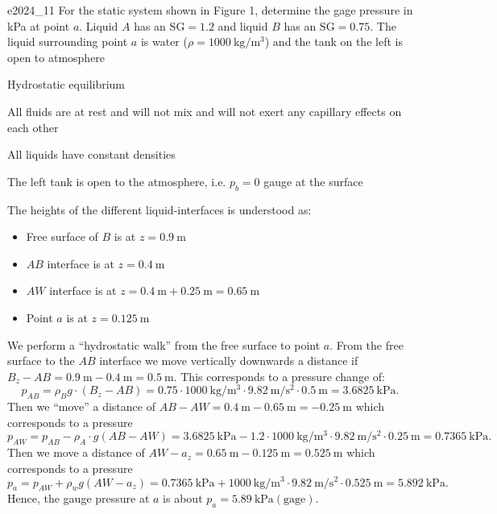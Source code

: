 

\begin{problemwithimage}{e2024_1}{1}
  For the static system shown in Figure 1, determine the gage pressure in \unit{\kPa} at point $a$.
  Liquid $A$ has an $\mathrm{SG} = \num{1,2} $ and liquid $B$ has an $\mathrm{SG} = \num{0,75}$.
  The liquid surrounding point $a$ is water ($\rho = \qty{1000}{\kg\per\m^3} $) and the tank on the left is open to atmosphere
\end{problemwithimage}

\begin{assumptions}
  \item Hydrostatic equilibrium
  \item All fluids are at rest and will not mix and will not exert any capillary effects on each other
  \item All liquids have constant densities 
  \item The left tank is open to the atmosphere, i.e. $p_b = 0$ gauge at the surface
\end{assumptions}

\begin{derivation}
  The heights of the different liquid-interfaces is understood as:
  \begin{itemize}
    \item Free surface of $B$ is at $z = \qty{0,9}{\m}$
    \item $AB$ interface is at $z = \qty{0,4}{\m}$
    \item $AW$ interface is at $z = \qty{0,4}{\m} + \qty{0,25}{\m} = \qty{0,65}{\m}$
    \item Point $a$ is at $z = \qty{0,125}{\m}$
  \end{itemize}
  We perform a ``hydrostatic walk'' from the free surface to point $a$.
  From the free surface to the $AB$ interface we move vertically downwards a distance if $B_z - AB = \qty{0,9}{\m} - \qty{0,4}{\m} = \qty{0,5}{\m}$. 
  This corresponds to a pressure change of:
  \begin{equation*}
    p_{AB} = \rho_B g \cdot (B_z - AB) = \num{0,75} \cdot \qty{1000}{\kg\per\m^3} \cdot \qty{9,82}{\m\per\s^2} \cdot \qty{0,5}{\m}   = \qty{3.6825}{\kilo\pascal}
  .\end{equation*}
  Then we ``move'' a distance of $AB - AW = \qty{0,4}{\m} - \qty{0,65}{\m} = -\qty{0,25}{\m}$ which corresponds to a pressure
  \begin{equation*}
    p_{AW} = p_{AB}- \rho_{A} \cdot g (AB - AW) = \qty{3,6825}{\kPa} - \num{1,2} \cdot \qty{1000}{\kg\per\m^3} \cdot \qty{9,82}{\m\per\s^2} \cdot \qty{0,25}{\m} = \qty{0.7365}{\kilo\pascal}
  .\end{equation*}
  Then we move a distance of $AW - a_z = \qty{0,65}{\m} - \qty{0,125}{\m} =  \qty{0,525}{\m}$ which corresponds to a pressure
  \begin{equation*}
    p_a = p_{AW} + \rho_w g (AW - a_z) = \qty{0,7365}{\kPa} + \qty{1000}{\kg\per\m^3} \cdot \qty{9,82}{\m\per\s^2} \cdot \qty{0,525}{\m}  = \qty{5.892}{\kilo\pascal}
  .\end{equation*}
  Hence, the gauge pressure at $a$ is about $p_a = \qty{5,89}{\kPa} (\text{gage})$.  
\end{derivation}

